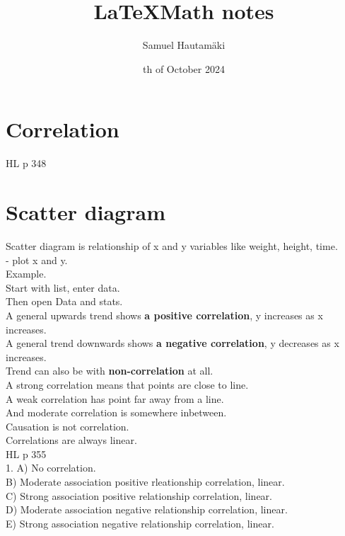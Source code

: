 \documentclass{article}
\title{\LaTeX Math notes}
\author{Samuel Hautamäki}
\date{th of October 2024}
\begin{document}
  \maketitle
   
  \section{Correlation}
  HL p 348

  \section{Scatter diagram}
  Scatter diagram is relationship of x and y variables like weight, height, time.\\
  - plot x and y.\\
  Example.\\
  Start with list, enter data.\\
  Then open Data and stats.\\
  A general upwards trend shows \textbf{a positive correlation}, y increases as x increases.\\
  A general trend downwards shows \textbf{a negative correlation}, y decreases as x increases.\\
  Trend can also be with \textbf{non-correlation} at all.\\
  A strong correlation means that points are close to line.\\
  A weak correlation has point far away from a line.\\
  And moderate correlation is somewhere inbetween.\\
  Causation is not correlation.\\
  Correlations are always linear.\\
  HL p 355\\
  1. A) No correlation.\\
  B) Moderate association positive rleationship correlation, linear. \\
  C) Strong association positive relationship correlation, linear.\\
  D) Moderate association negative relationship correlation, linear.\\
  E) Strong association negative relationship correlation, linear.\\
  
   
\end{document}
